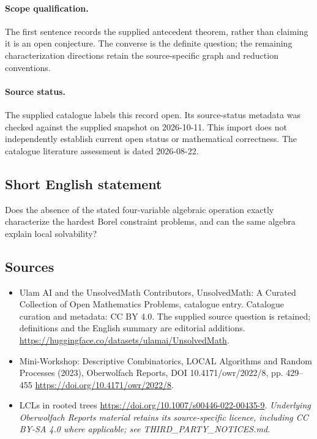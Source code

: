 \documentclass[11pt]{article}
\begin{document}
\paragraph{Scope qualification.}
The first sentence records the supplied antecedent theorem, rather than claiming it is an open conjecture. The converse is the definite question; the remaining characterization directions retain the source-specific graph and reduction conventions.
\paragraph{Source status.}
The supplied catalogue labels this record open. Its source-status metadata was checked against the supplied snapshot on 2026-10-11. This import does not independently establish current open status or mathematical correctness. The catalogue literature assessment is dated 2026-08-22.
\subsection{Short English statement}
Does the absence of the stated four-variable algebraic operation exactly characterize the hardest Borel constraint problems, and can the same algebra explain local solvability?
\subsection{Sources}
\begin{itemize}
\item[S1] Ulam AI and the UnsolvedMath Contributors, UnsolvedMath: A Curated Collection of Open Mathematics Problems, catalogue entry. Catalogue curation and metadata: CC BY 4.0. The supplied source question is retained; definitions and the English summary are editorial additions.
\url{https://huggingface.co/datasets/ulamai/UnsolvedMath}.
\item[S2] Mini-Workshop: Descriptive Combinatorics, LOCAL Algorithms and Random Processes (2023), Oberwolfach Reports, DOI 10.4171/owr/2022/8, pp. 429--455
\url{https://doi.org/10.4171/owr/2022/8}.
\item[S3] LCLs in rooted trees
\url{https://doi.org/10.1007/s00446-022-00435-9}.
\textit{Underlying Oberwolfach Reports material retains its source-specific licence, including CC BY-SA 4.0 where applicable; see THIRD\_PARTY\_NOTICES.md.}
\end{itemize}
\end{document}
